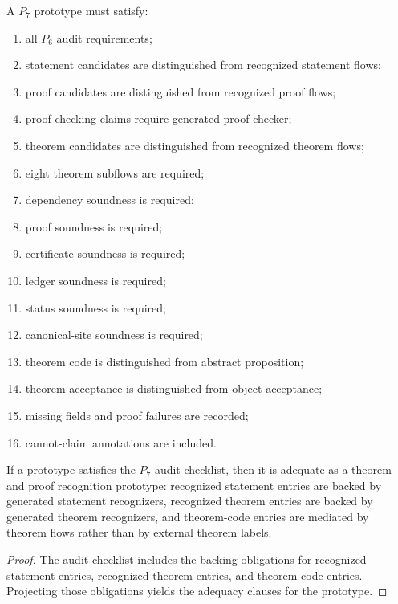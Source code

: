 \begin{definition}
\label{def:theorem-proof-p7-audit}
A $P_7$ prototype must satisfy:
\begin{enumerate}
\item all $P_6$ audit requirements;
\item statement candidates are distinguished from recognized statement flows;
\item proof candidates are distinguished from recognized proof flows;
\item proof-checking claims require generated proof checker;
\item theorem candidates are distinguished from recognized theorem flows;
\item eight theorem subflows are required;
\item dependency soundness is required;
\item proof soundness is required;
\item certificate soundness is required;
\item ledger soundness is required;
\item status soundness is required;
\item canonical-site soundness is required;
\item theorem code is distinguished from abstract proposition;
\item theorem acceptance is distinguished from object acceptance;
\item missing fields and proof failures are recorded;
\item cannot-claim annotations are included.
\end{enumerate}
\end{definition}

\begin{theorem}
\label{thm:theorem-proof-p7-adequacy}
If a prototype satisfies the $P_7$ audit checklist, then it is adequate as a theorem and proof recognition prototype: recognized statement entries are backed by generated statement recognizers, recognized theorem entries are backed by generated theorem recognizers, and theorem-code entries are mediated by theorem flows rather than by external theorem labels.
\end{theorem}

\begin{proof}
The audit checklist includes the backing obligations for recognized statement entries, recognized theorem entries, and theorem-code entries. Projecting those obligations yields the adequacy clauses for the prototype.
\end{proof}

